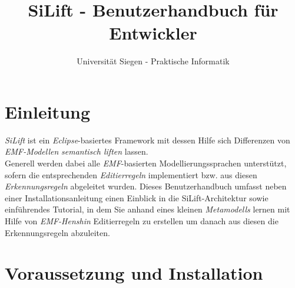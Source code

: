 \documentclass[a4paper]{scrartcl}
\begin{document}
\title{SiLift - Benutzerhandbuch für Entwickler}
\author{Universität Siegen - Praktische Informatik}


\maketitle



\newpage

\tableofcontents
\newpage

\section{Einleitung}

\textit{SiLift} ist ein \textit{Eclipse}-basiertes Framework mit dessen Hilfe sich Differenzen von \textit{EMF-Modellen} \textit{semantisch liften} lassen.\\
Generell werden dabei alle \textit{EMF}-basierten Modellierungssprachen unterstützt, sofern die ent\-sprech\-en\-den \textit{Editier\-regeln} implementiert bzw. aus diesen \textit{Er\-ken\-nungs\-re\-geln} abgeleitet wurden.
Dieses Benutzerhandbuch umfasst neben einer Installationsanleitung einen Einblick in die SiLift-Architektur sowie ein\-führ\-en\-des Tutorial, in dem Sie anhand eines kleinen \textit{Metamodells} lernen mit Hilfe von \textit{EMF-Henshin} Editierregeln zu erstellen um danach aus diesen die Erkennungsregeln abzuleiten.


\section{Voraussetzung und Installation}
\end{document}
